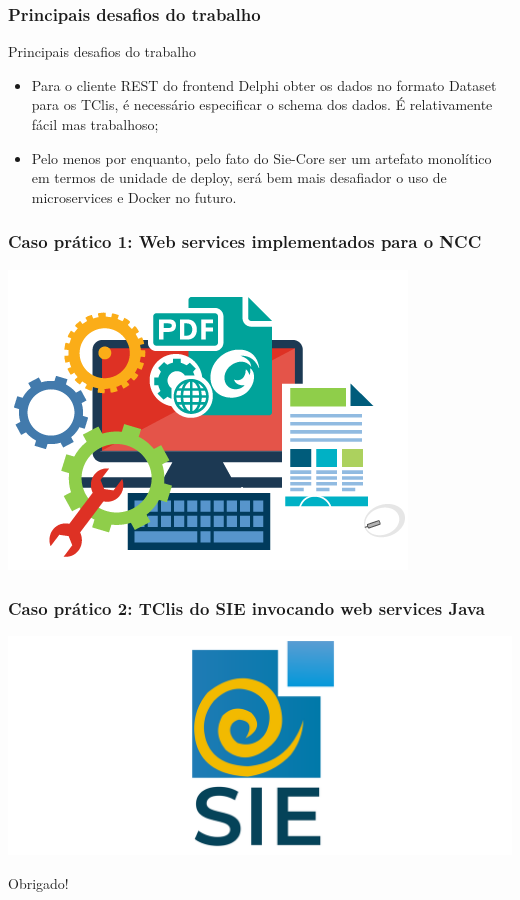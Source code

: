 \documentclass{beamer}
\begin{document}
\begin{frame}
\frametitle{Principais desafios do trabalho}

\begin{exampleblock}{Principais desafios do trabalho}
\small{
	\begin{itemize}
		\item<1->Para o cliente REST do frontend Delphi obter os dados no formato Dataset para os TClis, é necessário especificar o schema dos dados. É relativamente fácil mas trabalhoso;
		\item<1->Pelo menos por enquanto, pelo fato do Sie-Core ser um artefato monolítico em termos de unidade de deploy, será bem mais desafiador o uso de microservices e Docker no futuro.
	\end{itemize}
}
\end{exampleblock}

\end{frame}




\begin{frame}
  \frametitle{Caso prático 1: Web services implementados para o NCC}

	\centering
	\includegraphics[scale=0.4]{img/sdk.png}
  
\end{frame}


\begin{frame}
  \frametitle{Caso prático 2: TClis do SIE invocando web services Java}

	\centering
	\includegraphics[scale=0.4]{img/sie.png}
  
\end{frame}






\begin{frame}[c]{ }
\centering
  \huge{Obrigado!}
\end{frame}
\end{document}

